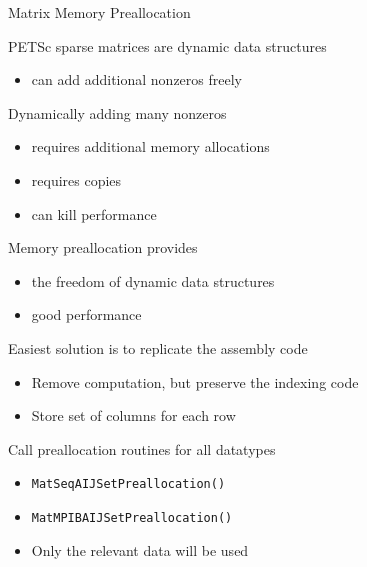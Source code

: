 \begin{frame}[fragile]{Matrix Memory Preallocation}
 \begin{block}{PETSc sparse matrices are dynamic data structures}
  \begin{itemize} \vspace*{-0.2cm}
    \item can add additional nonzeros freely
  \end{itemize}
 \end{block}  \vspace*{-0.2cm}

 \begin{block}{Dynamically adding many nonzeros}
  \begin{itemize} \vspace*{-0.2cm}
    \item requires additional memory allocations
    \item requires copies
    \item can kill performance
  \end{itemize}
 \end{block} \vspace*{-0.2cm}

 \begin{block}{Memory preallocation provides}
  \begin{itemize} \vspace*{-0.2cm}
    \item the freedom of dynamic data structures
    \item good performance
  \end{itemize}
 \end{block} \vspace*{-0.2cm}

 \begin{block}{Easiest solution is to replicate the assembly code}
  \begin{itemize} \vspace*{-0.2cm}
    \item Remove computation, but preserve the indexing code
    \item Store set of columns for each row
  \end{itemize}
 \end{block} \vspace*{-0.2cm}

 \begin{block}{Call preallocation routines for all datatypes}
  \begin{itemize} \vspace*{-0.2cm}
    \item \lstinline|MatSeqAIJSetPreallocation()|
    \item \lstinline|MatMPIBAIJSetPreallocation()|
    \item Only the relevant data will be used
  \end{itemize}
\end{block}
\end{frame}




